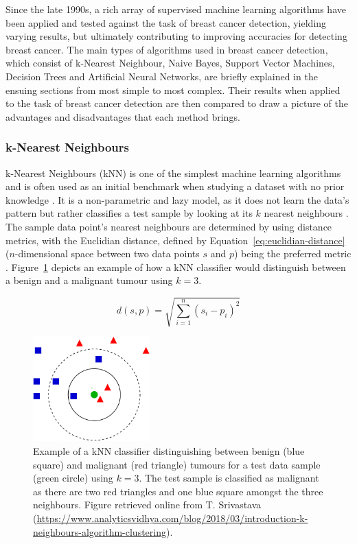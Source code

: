 Since the late 1990s, a rich array of supervised machine learning algorithms have been applied and tested against the task of breast cancer detection, yielding varying results, but ultimately contributing to improving accuracies for detecting breast cancer. The main types of algorithms used in breast cancer detection, which consist of k-Nearest Neighbour, Naive Bayes, Support Vector Machines, Decision Trees and Artificial Neural Networks, are briefly explained in the ensuing sections from most simple to most complex. Their results when applied to the task of breast cancer detection are then compared to draw a picture of the advantages and disadvantages that each method brings.

\subsubsection{k-Nearest Neighbours}
\label{sec:litreview-knn}

k-Nearest Neighbours (kNN) is one of the simplest machine learning algorithms and is often used as an initial benchmark when studying a dataset with no prior knowledge \cite{peterson2009k}. It is a non-parametric and lazy model, as it does not learn the data's pattern but rather classifies a test sample by looking at its $k$ nearest neighbours \cite{Yue2018}. The sample data point's nearest neighbours are determined by using distance metrics, with the Euclidian distance, defined by Equation~\ref{eq:euclidian-distance} ($n$-dimensional space between two data points $s$ and $p$) being the preferred metric \cite{peterson2009k}. Figure~\ref{fig:litsurvey-knn-example} depicts an example of how a kNN classifier would distinguish between a benign and a malignant tumour using $k=3$.

\begin{equation}
\label{eq:euclidian-distance}
    d(s,p)=\sqrt{\sum_{i=1}^{n}(s_i-p_i)^2}
\end{equation}

\begin{figure}[h]
\centerline{\includegraphics[width=0.4\textwidth]{Dissertation/figures/litsurvey/knn.png}}
\caption{\label{fig:litsurvey-knn-example}Example of a kNN classifier distinguishing between benign (blue square) and malignant (red triangle) tumours for a test data sample (green circle) using $k=3$. The test sample is classified as malignant as there are two red triangles and one blue square amongst the three neighbours. Figure retrieved online from T. Srivastava (\url{https://www.analyticsvidhya.com/blog/2018/03/introduction-k-neighbours-algorithm-clustering}).}
\end{figure}

